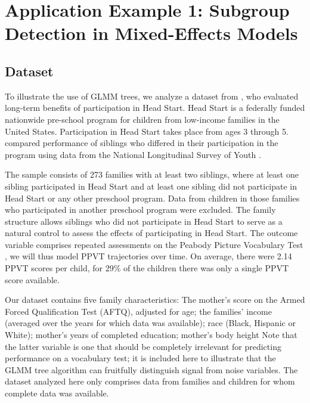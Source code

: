 \documentclass[doc,floatsintext,natbib]{apa7}
\begin{document}


\newpage
\section{Application Example 1: Subgroup Detection in Mixed-Effects Models}
\label{sec:TutorialMixed}



\subsection{Dataset}

To illustrate the use of GLMM trees, we analyze a dataset from \cite{Demi09}, who evaluated long-term benefits of participation in Head Start. Head Start is a federally funded nationwide pre-school program for children from low-income families in the United States. Participation in Head Start takes place from ages 3 through 5. \cite{Demi09} compared performance of siblings who differed in their participation in the program using data from the National Longitudinal Survey of Youth \citep{NLSY}. 

The sample consists of 273 families with at least two siblings, where at least one sibling participated in Head Start and at least one sibling did not participate in Head Start or any other preschool program. Data from children in those families who participated in another preschool program were excluded. The family structure allows siblings who did not participate in Head Start to serve as a natural control to assess the effects of participating in Head Start. The outcome variable comprises repeated assessments on the Peabody Picture Vocabulary Test \citep[PPVT]{DunnyDunn81}, we will thus model PPVT trajectories over time. On average, there were 2.14 PPVT scores per child, for 29\% of the children there was only a single PPVT score available. 


Our dataset contains five family characteristics: The mother's score on the Armed Forced Qualification Test (AFTQ), adjusted for age; the families' income (averaged over the years for which data was available); race (Black, Hispanic or White); mother's years of completed education; mother's body height %
Note that the latter variable is one that should be completely irrelevant for predicting performance on a vocabulary test; it is included here to illustrate that the GLMM tree algorithm can fruitfully distinguish signal from noise variables. The dataset analyzed here only comprises data from families and children for whom complete data was available. 
\end{document}

